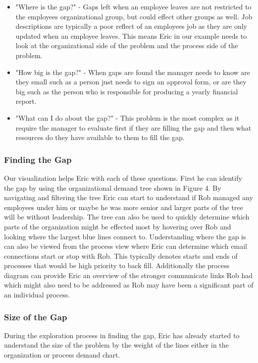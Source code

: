 \documentclass[journal]{vgtc}                %
\begin{document}
\begin{itemize}
	\item "Where is the gap?" - Gaps left when an employee leaves are not restricted to the employees organizational group, but could effect other groups as well.  Job descriptions are typically a poor reflect of an employees job as they are only updated when an employee leaves.  This means Eric in our example needs to look at the organizational side of the problem and the process side of the problem.
	\item "How big is the gap?" - When gaps are found the manager needs to know are they small such as a person just needs to sign an approval form, or are they big such as the person who is responsible for producing a yearly financial report.
	\item "What can I do about the gap?" - This problem is the most complex as it require the manager to evaluate first if they are filling the gap and then what resources do they have available to them to fill the gap.
\end{itemize}

\subsubsection{Finding the Gap}
Our visualization helps Eric with each of these questions.  First he can identify the gap by using the organizational demand tree shown in Figure 4.  By navigating and filtering the tree Eric can start to understand if Rob managed any employees under him or maybe he was more senior and larger parts of the tree will be without leadership.  The tree can also be used to quickly determine which parts of the organization might be effected most by hovering over Rob and looking where the largest blue lines connect to.
Understanding where the gap is can also be viewed from the process view where Eric can determine which email connections start or stop with Rob.  This typically denotes starts and ends of processes that would be high priority to back fill.  Additionally the process diagram can provide Eric an overview of the stronger communicate links Rob had which might also need to be addressed as Rob may have been a significant part of an individual process.

\subsubsection{Size of the Gap}
During the exploration process in finding the gap, Eric has already started to understand the size of the problem by the weight of the lines either in the organization or process demand chart.
\end{document}
